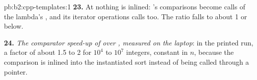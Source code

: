 \begin{solution}{pb:b2:cpp-templates:1}
\textbf{23.} At  nothing is inlined: 's comparisons become calls of the lambda's
, and its iterator operations calls too. The ratio falls to about 1 or below.

\textbf{24.} \emph{The comparator speed-up of  over , measured on the laptop}: in the
printed run, a factor of about 1.5 to 2 for $10^4$ to $10^7$ integers, constant in $n$, because the comparison is
inlined into the instantiated sort instead of being called through a pointer.
\end{solution}
